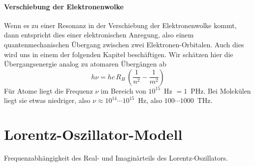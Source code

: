 \paragraph{Verschiebung der Elektronenwolke} Wenn es zu einer Resonanz in der Verschiebung der Elektronenwolke kommt, dann entspricht dies einer elektronischen Anregung, also einem quantenmechanischen Übergang zwischen zwei Elektronen-Orbitalen. Auch dies wird uns in einem der folgenden Kapitel beschäftigen. Wir schätzen hier die Übergangsenergie analog zu atomaren Übergängen ab
\begin{equation}
  h \nu = hc \, R_H \, \left( \frac{1}{n^2} - \frac{1}{m^2} \right)
\end{equation}
Für Atome liegt die Frequenz $\nu$ im Bereich von $10^{15}$~Hz $= 1$~PHz. Bei Molekülen liegt sie etwas niedriger, also $\nu \approx 10^{14} \cdots 10^{15}$~Hz, also $100 \cdots 1000$~THz.


\section{Lorentz-Oszillator-Modell}


\begin{marginfigure}

\caption{Frequenzabhängigkeit des Real- und Imaginärteils des Lorentz-Oszillators. \label{fig:diel_lorentz}}
\end{marginfigure}

